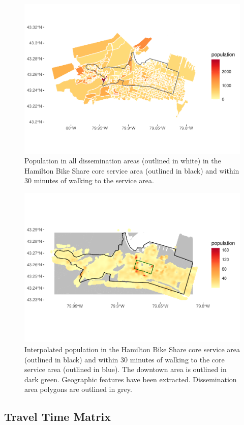 \documentclass[]{elsarticle} %
\begin{document}
\begin{figure}

{\centering \includegraphics[width=0.65\linewidth]{Bike-share-spatial-equity_files/figure-latex/da-population-1} 

}

\caption{Population in all dissemination areas (outlined in white) in the Hamilton Bike Share core service area (outlined in black) and within 30 minutes of walking to the service area.}\label{fig:da-population}
\end{figure}

\begin{figure}

{\centering \includegraphics[width=0.65\linewidth]{Bike-share-spatial-equity_files/figure-latex/interpolated-population-1} 

}

\caption{Interpolated population in the Hamilton Bike Share core service area (outlined in black) and within 30 minutes of walking to the core service area (outlined in blue). The downtown area is outlined in dark green. Geographic features have been extracted. Dissemination area polygons are outlined in grey.}\label{fig:interpolated-population}
\end{figure}

\hypertarget{travel-time-matrix}{%
\subsection{Travel Time Matrix}\label{travel-time-matrix}}
\end{document}
